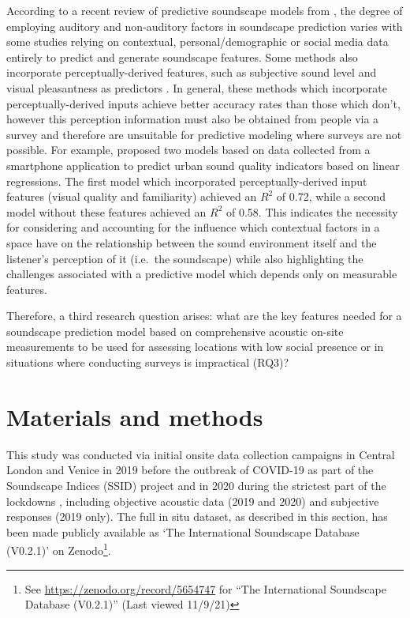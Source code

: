 \documentclass[
  authoryear,
  preprint,
  3p,
  onecolumn]{elsarticle}
\begin{document}
According to a recent review of predictive soundscape models from
\citet{Lionello2020systematic}, the degree of employing auditory and
non-auditory factors in soundscape prediction varies with some studies
relying on contextual, personal/demographic
\citep{Erfanian2021Psychological, Tarlao2020Investigating} or social
media \citep{Aiello2016Chatty} data entirely to predict and generate
soundscape features. Some methods also incorporate perceptually-derived
features, such as subjective sound level and visual pleasantness as
predictors \citep{Lionello2020systematic}. In general, these methods
which incorporate perceptually-derived inputs achieve better accuracy
rates than those which don't, however this perception information must
also be obtained from people via a survey and therefore are unsuitable
for predictive modeling where surveys are not possible. For example,
\citet{Ricciardi2015Sound} proposed two models based on data collected
from a smartphone application to predict urban sound quality indicators
based on linear regressions. The first model which incorporated
perceptually-derived input features (visual quality and familiarity)
achieved an \(R^2\) of 0.72, while a second model without these features
achieved an \(R^2\) of 0.58. This indicates the necessity for
considering and accounting for the influence which contextual factors in
a space have on the relationship between the sound environment itself
and the listener's perception of it (i.e.~the soundscape) while also
highlighting the challenges associated with a predictive model which
depends only on measurable features.

Therefore, a third research question arises: what are the key features
needed for a soundscape prediction model based on comprehensive acoustic
on-site measurements to be used for assessing locations with low social
presence or in situations where conducting surveys is impractical (RQ3)?

\section{Materials and methods}\label{materials-and-methods}

This study was conducted via initial onsite data collection campaigns in
Central London and Venice in 2019 before the outbreak of COVID-19 as
part of the Soundscape Indices (SSID) project
\citep{Mitchell2020Soundscape} and in 2020 during the strictest part of
the lockdowns \citep{Aletta2020Assessing}, including objective acoustic
data (2019 and 2020) and subjective responses (2019 only). The full in
situ dataset, as described in this section, has been made publicly
available as `The International Soundscape Database (V0.2.1)' on
Zenodo\footnote{See \url{https://zenodo.org/record/5654747} for ``The
  International Soundscape Database (V0.2.1)'' (Last viewed 11/9/21)}\citep{Mitchell2021International}.
\end{document}
